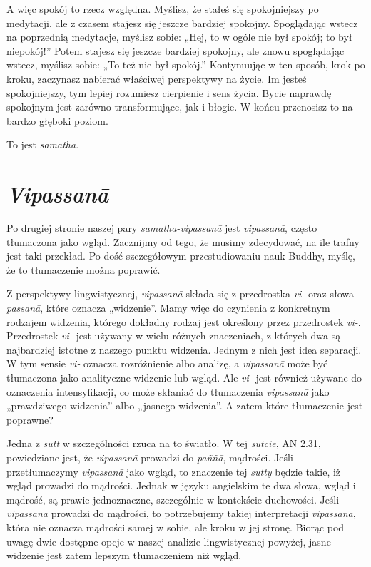 \documentclass[12pt,openany]{book}
\begin{document}
A więc spokój to rzecz względna. Myślisz, że stałeś się spokojniejszy po medytacji, ale z czasem stajesz się jeszcze bardziej spokojny. Spoglądając wstecz na poprzednią medytacje, myślisz sobie: „Hej, to w ogóle nie był spokój; to był niepokój!” Potem stajesz się jeszcze bardziej spokojny, ale znowu spoglądając wstecz, myślisz sobie: „To też nie był spokój.” Kontynuując w ten sposób, krok po kroku, zaczynasz nabierać właściwej perspektywy na życie. Im jesteś spokojniejszy, tym lepiej rozumiesz cierpienie i sens życia. Bycie naprawdę spokojnym jest zarówno transformujące, jak i błogie. W końcu przenosisz to na bardzo głęboki poziom.

To jest \textit{samatha}.

\section*{\textit{Vipassanā}}

Po drugiej stronie naszej pary \textit{samatha}\textit{-vipassanā} jest \textit{vipassanā}, \linebreak często tłumaczona jako wgląd. Zacznijmy od tego, że musimy \linebreak zdecydować, na ile trafny jest taki przekład. Po dość szczegółowym przestudiowaniu nauk Buddhy, myślę, że to tłumaczenie można poprawić.

Z perspektywy lingwistycznej, \textit{vipassanā} składa się z przedrostka \textit{vi-} oraz słowa \textit{passanā}, które oznacza „widzenie”. Mamy więc do czynienia z konkretnym rodzajem widzenia, którego dokładny rodzaj jest określony przez przedrostek \textit{vi-}. Przedrostek \textit{vi-} jest używany w wielu różnych znaczeniach, z których dwa są najbardziej istotne z naszego punktu widzenia. Jednym z nich jest idea separacji. W tym sensie \textit{vi-} oznacza rozróżnienie albo analizę, a \textit{vipassanā} może być tłumaczona jako analityczne widzenie lub wgląd. Ale \textit{vi-} jest również używane do oznaczenia intensyfikacji, co może skłaniać do tłumaczenia \textit{vipassanā} jako „prawdziwego widzenia” albo „jasnego widzenia”. A zatem które tłumaczenie jest poprawne?

Jedna z \textit{sutt} w szczególności rzuca na to światło. W tej \textit{sutcie}, AN 2.31, powiedziane jest, że \textit{vipassanā} prowadzi do \textit{paññā}, mądrości. Jeśli przetłumaczymy \textit{vipassanā} jako wgląd, to znaczenie tej \textit{sutty} będzie takie, iż wgląd prowadzi do mądrości. Jednak w języku angielskim te dwa słowa, wgląd i mądrość, są prawie jednoznaczne, szczególnie w kontekście duchowości. Jeśli \textit{vipassanā} prowadzi do mądrości, to potrzebujemy takiej interpretacji \textit{vipassanā}, która nie oznacza mądrości samej w sobie, ale kroku w jej stronę. Biorąc pod uwagę dwie dostępne opcje w naszej analizie lingwistycznej powyżej, jasne widzenie jest zatem lepszym tłumaczeniem niż wgląd.
\end{document}
